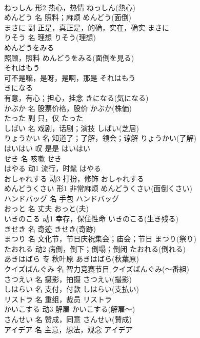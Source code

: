 \documentclass[8pt]{extreport}
\begin{document}
\begin{CJK}{UTF8}{min}
\\	ねっしん	形2	热心，热情	ねっしん(熱心)	
\\	めんどう	名	照料；麻烦	めんどう(面倒)	
\\	まさに	副	正是，真正是，的确，实在，确实	まさに	
\\	りそう	名	理想	りそう(理想)	
\\	めんどうをみる	
\\	照顾，照料	めんどうをみる(面倒を見る)	
\\	それはもう	
\\	可不是嘛，是呀，是啊，那是	それはもう	
\\	きになる	
\\	有意，有心；担心，挂念	きになる(気になる)	
\\	かぶか	名	股票价格，股价	かぶか(株価)	
\\	たった	副	只，仅	たった	
\\	しばい	名	戏剧，话剧；演技	しばい(芝居)	
\\	りょうかい	名	知道了；了解，领会；谅解	りょうかい(了解)	
\\	はいはい	叹	是是	はいはい	
\\	せき	名	咳嗽	せき	
\\	はやる	动1	流行，时髦	はやる	
\\	おしゃれする	动3	打扮，修饰	おしゃれする	
\\	めんどうくさい	形1	非常麻烦	めんどうくさい(面倒くさい)	
\\	ハンドバッグ	名	手包	ハンドバッグ	
\\	おっと	名	丈夫	おっと(夫)	
\\	いきのこる	动1	幸存，保住性命	いきのこる(生き残る)	
\\	きせき	名	奇迹	きせき(奇跡)	
\\	まつり	名	文化节，节日庆祝集会；庙会；节日	まつり(祭り)	
\\	たおれる	动2	病倒，倒下；倒塌；倒闭	たおれる(倒れる)	
\\	あきはばら	专	秋叶原	あきはばら(秋葉原)	
\\	クイズばんぐみ	名	智力竞赛节目	クイズばんぐみ(～番組)	
\\	さつえい	名	摄影，拍摄	さつえい(撮影)	
\\	しはらい	名	支付，付款	しはらい(支払い)	
\\	リストラ	名	重组，裁员	リストラ	
\\	かいこする	动3	解雇	かいこする(解雇～)	
\\	さんせい	名	赞成，同意	さんせい(賛成)	
\\	アイデア	名	主意，想法，观念	アイデア	

\end{CJK}
\end{document}

